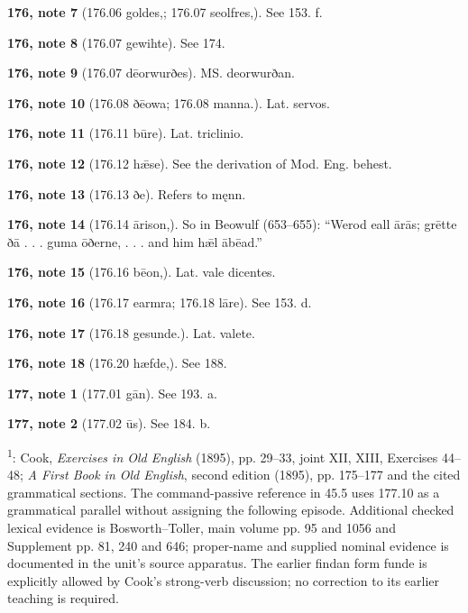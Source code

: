 \textbf{176, note 7} (176.06 goldes,; 176.07 seolfres,). See 153. f.

\textbf{176, note 8} (176.07 gewihte). See 174.

\textbf{176, note 9} (176.07 dēorwurðes). MS. deorwurðan.

\textbf{176, note 10} (176.08 ðēowa; 176.08 manna.). Lat. servos.

\textbf{176, note 11} (176.11 būre). Lat. triclinio.

\textbf{176, note 12} (176.12 hǣse). See the derivation of Mod. Eng. behest.

\textbf{176, note 13} (176.13 ðe). Refers to męnn.

\textbf{176, note 14} (176.14 ārison,). So in Beowulf (653–655): “Werod eall ārās; grētte ðā . . . guma ōðerne, . . . and him hǣl ābēad.”

\textbf{176, note 15} (176.16 bēon,). Lat. vale dicentes.

\textbf{176, note 16} (176.17 earmra; 176.18 lāre). See 153. d.

\textbf{176, note 17} (176.18 gesunde.). Lat. valete.

\textbf{176, note 18} (176.20 hæfde,). See 188.

\textbf{177, note 1} (177.01 gān). See 193. a.

\textbf{177, note 2} (177.02 ūs). See 184. b.

\textsuperscript{1}: Cook, \emph{Exercises in Old English} (1895), pp. 29–33, joint XII, XIII, Exercises 44–48; \emph{A First Book in Old English}, second edition (1895), pp. 175–177 and the cited grammatical sections. The command-passive reference in 45.5 uses 177.10 as a grammatical parallel without assigning the following episode. Additional checked lexical evidence is Bosworth–Toller, main volume pp. 95 and 1056 and Supplement pp. 81, 240 and 646; proper-name and supplied nominal evidence is documented in the unit’s source apparatus. The earlier findan form funde is explicitly allowed by Cook’s strong-verb discussion; no correction to its earlier teaching is required.


